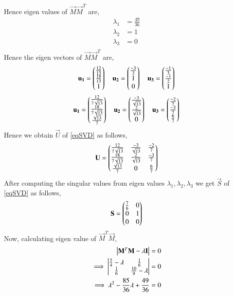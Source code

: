 \documentclass[journal,12pt,twocolumn]{IEEEtran}
\begin{document}
Hence eigen values of $\vec{M}\vec{M}^T$ are,
\begin{align}
\lambda_1 &= \frac{49}{36}\\
\lambda_2 &= 1\\
\lambda_3 &= 0\\
\end{align}
Hence the eigen vectors of $\vec{M}\vec{M}^T$ are,
\begin{align}
\mathbf{u_1}=\begin{pmatrix}\frac{12}{13}\\\frac{18}{13}\\1\end{pmatrix}\quad
\mathbf{u_2}=\begin{pmatrix}\frac{-3}{2}\\1\\0\end{pmatrix}\quad
\mathbf{u_3}=\begin{pmatrix}\frac{-1}{3}\\\frac{-1}{2}\\1\end{pmatrix}
\end{align}
\begin{align}
\mathbf{u_1}=\begin{pmatrix}\frac{12}{7\sqrt{13}}\\\frac{18}{7\sqrt{13}}\\\frac{\sqrt{13}}{7}\end{pmatrix}\quad
\mathbf{u_2}=\begin{pmatrix}\frac{-3}{\sqrt{13}}\\\frac{2}{\sqrt{13}}\\0\end{pmatrix}\quad
\mathbf{u_3}=\begin{pmatrix}\frac{-2}{7}\\\frac{-3}{7}\\\frac{6}{7}\end{pmatrix}
\end{align}
Hence we obtain $\vec{U}$ of \eqref{eqSVD} as follows,
\begin{align}
\mathbf{U}=\begin{pmatrix}\frac{12}{7\sqrt{13}}&\frac{-3}{\sqrt{13}}&\frac{-2}{7}\\\frac{18}{7\sqrt{13}}&\frac{2}{\sqrt{13}}&\frac{-3}{7}\\\frac{\sqrt{13}}{7}&0&\frac{6}{7}\end{pmatrix}\label{eqU}
\end{align}
After computing the singular values from eigen values $\lambda_1, \lambda_2, \lambda_3$ we get $\vec{S}$ of \eqref{eqSVD} as follows,
\begin{align}
\mathbf{S}=\begin{pmatrix}\frac{7}{6}&0\\0&1\\0&0\end{pmatrix}\label{eqS}
\end{align}
Now, calculating eigen value of $\vec{M}^T\vec{M}$,
\begin{align}
\begin{vmatrix}\mathbf{M}^T\mathbf{M} - \lambda\mathbf{I}\end{vmatrix} &= 0\\
\implies\begin{vmatrix}\frac{5}{4}-\lambda&\frac{1}{6}\\\frac{1}{6}&\frac{10}{9}-\lambda\end{vmatrix} &=0\\
\implies\lambda^2-\frac{85}{36}\lambda+\frac{49}{36} &=0
\end{align}
\end{document}

